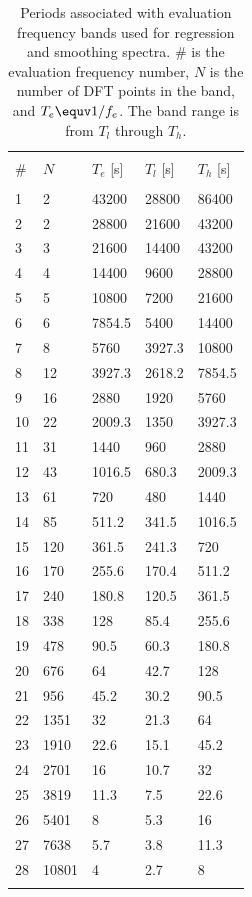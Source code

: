 \documentclass[draft,linenumbers]{agujournal2018}
\begin{document}
\begin{table}
  \caption{Periods associated with evaluation frequency bands used for regression and smoothing spectra. \# is the evaluation frequency number, $N$ is the number of DFT points in the band, and $T_e\equv 1/f_e$. The band range is from $T_l$ through $T_h$.}
  \centering
  \begin{tabular}{l l l l l}
    \hline \\
    \# & $N$ & $T_e$ [s] & $T_l$ [s] & $T_h$ [s] \\
    \hline \\
    1 & 2 & 43200 & 28800 & 86400 \\
    2 & 2 & 28800 & 21600 & 43200 \\
    3 & 3 & 21600 & 14400 & 43200 \\
    4 & 4 & 14400 & 9600 & 28800 \\
    5 & 5 & 10800 & 7200 & 21600 \\
    6 & 6 & 7854.5 & 5400 & 14400 \\
    7 & 8 & 5760 & 3927.3 & 10800 \\
    8 & 12 & 3927.3 & 2618.2 & 7854.5 \\
    9 & 16 & 2880 & 1920 & 5760 \\
    10 & 22 & 2009.3 & 1350 & 3927.3 \\
    11 & 31 & 1440 & 960 & 2880 \\
    12 & 43 & 1016.5 & 680.3 & 2009.3 \\
    13 & 61 & 720 & 480 & 1440 \\
    14 & 85 & 511.2 & 341.5 & 1016.5 \\
    15 & 120 & 361.5 & 241.3 & 720 \\
    16 & 170 & 255.6 & 170.4 & 511.2 \\
    17 & 240 & 180.8 & 120.5 & 361.5 \\
    18 & 338 & 128 & 85.4 & 255.6 \\
    19 & 478 & 90.5 & 60.3 & 180.8 \\
    20 & 676 & 64 & 42.7 & 128 \\
    21 & 956 & 45.2 & 30.2 & 90.5 \\
    22 & 1351 & 32 & 21.3 & 64 \\
    23 & 1910 & 22.6 & 15.1 & 45.2 \\
    24 & 2701 & 16 & 10.7 & 32 \\
    25 & 3819 & 11.3 & 7.5 & 22.6 \\
    26 & 5401 & 8 & 5.3 & 16 \\
    27 & 7638 & 5.7 & 3.8 & 11.3 \\
    28 & 10801 & 4 & 2.7 & 8 \\
    \hline \\
  \end{tabular}
  \label{evaluationperiods}
\end{table}

\clearpage


\end{document}
